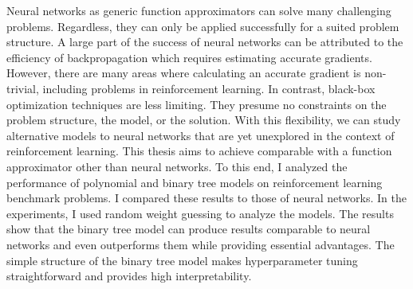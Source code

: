 
Neural networks as generic function approximators can solve many challenging problems. Regardless, they can only be applied successfully for a suited problem structure. A large part of the success of neural networks can be attributed to the efficiency of backpropagation which requires estimating accurate gradients. However, there are many areas where calculating an accurate gradient is non-trivial, including problems in reinforcement learning. In contrast, black-box optimization techniques are less limiting. They presume no constraints on the problem structure, the model, or the solution. With this flexibility, we can study alternative models to neural networks that are yet unexplored in the context of reinforcement learning. This thesis aims to achieve comparable with a function approximator other than neural networks. To this end, I analyzed the performance of polynomial and binary tree models on reinforcement learning benchmark problems. I compared these results to those of neural networks. In the experiments, I used random weight guessing to analyze the models. The results show that the binary tree model can produce results comparable to neural networks and even outperforms them while providing essential advantages. The simple structure of the binary tree model makes hyperparameter tuning straightforward and provides high interpretability.
